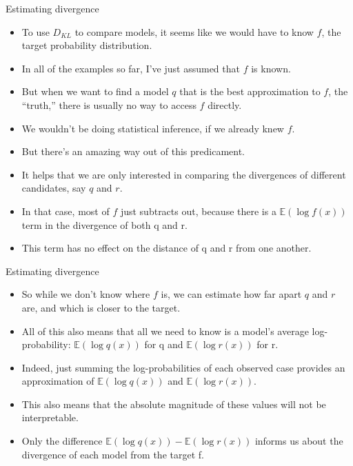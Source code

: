\documentclass[handout]{beamer}
\begin{document}
\begin{frame}{Estimating divergence}
\scriptsize{

\begin{itemize}

\item  To use $D_{KL}$ to compare models, it seems like we would have to know $f$, the target probability distribution.
\item In all of the examples so far, I've just assumed that $f$ is known.
\item But when we want to find a model $q$ that is the best approximation to $f$, the ``truth,'' there is usually no way to access $f$ directly.
\item We wouldn't be doing statistical inference, if we already knew $f$.

\item But there's an amazing way out of this predicament. 
\item It helps that we are only interested in comparing the divergences of different candidates, say $q$ and $r$. 
\item In that case, most of $f$ just subtracts out, because there is a $\mathbb{E}(\log f(x))$ term in the divergence of both q and r.
\item This term has no effect on the distance of q and r from one another. 

\end{itemize}


} 
\end{frame}


\begin{frame}{Estimating divergence}
\scriptsize{

\begin{itemize}

\item So while we don't know where $f$ is, we can estimate how far apart $q$ and $r$ are, and which is closer to the target.


\item All of this also means that all we need to know is a model's average log-probability: $\mathbb{E}(\log q(x))$ for q and $\mathbb{E}(\log r(x))$ for r. 

\item Indeed, just summing the log-probabilities of each observed case provides an approximation of $\mathbb{E}(\log q(x))$ and $\mathbb{E}(\log r(x))$.

\item This also means that the absolute magnitude of these values will not be interpretable.

\item Only the difference  $\mathbb{E}(\log q(x)) - \mathbb{E}(\log r(x))$ informs us about the divergence of each model from the target f.


\end{itemize}


} 
\end{frame}
\end{document}
